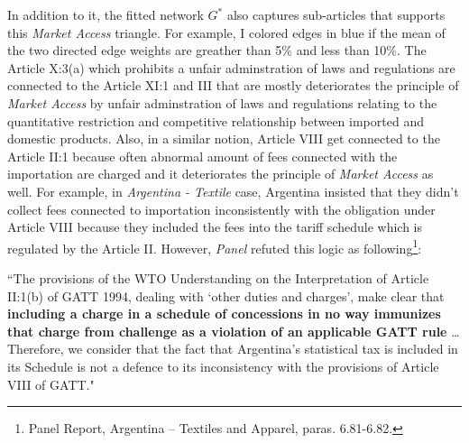 In addition to it, 
the fitted network $G^*$ also captures sub-articles that supports this \textit{Market Access} triangle. For example, I colored edges in blue if the mean of the two directed edge weights are greather than 5\% and less than 10\%.
The Article X:3(a) which prohibits a unfair adminstration of laws and regulations are connected to the Article XI:1 and III that are mostly 
deteriorates the principle of \textit{Market Access} by unfair adminstration of laws and regulations relating to the quantitative restriction 
and competitive relationship between imported and domestic products. Also, in a similar notion, Article VIII get connected to the Article II:1 because 
often abnormal amount of fees connected with the importation are charged and it deteriorates the principle of \textit{Market Access} as well. For example, in \textit{Argentina - Textile} case, Argentina insisted that they didn't collect fees connected to importation inconsistently with the obligation under Article VIII because they included the fees into the tariff schedule which is regulated by the Article II.
However, \textit{Panel} refuted this logic as following\footnote{Panel Report, Argentina – Textiles and Apparel, paras. 6.81-6.82.}:

\begin{displayquote}[][]
``The provisions of the WTO Understanding on the Interpretation of Article II:1(b) of
GATT 1994, dealing with `other duties and charges’, make clear that \textbf{including a
charge in a schedule of concessions in no way immunizes that charge from challenge
as a violation of an applicable GATT rule} \ldots Therefore, we consider that the fact that Argentina's statistical tax is included in its
Schedule is not a defence to its inconsistency with the provisions of Article VIII of
GATT."
\end{displayquote}







